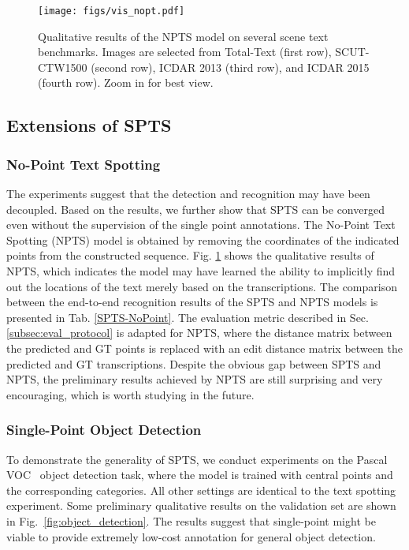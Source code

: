 \documentclass[sigconf]{acmart}
\begin{document}
\begin{figure}[t!]
    \centering
    \texttt{[image: figs/vis\_nopt.pdf]}
    \caption{Qualitative results of the NPTS model on several scene text benchmarks. Images are selected from Total-Text (first row), SCUT-CTW1500 (second row), ICDAR 2013 (third row), and ICDAR 2015 (fourth row). Zoom in for best view.}
    \label{fig:vis_wopoint}
\end{figure}

\subsection{Extensions of SPTS}
\subsubsection{No-Point Text Spotting}
The experiments suggest that the detection and recognition may have been decoupled. Based on the results, we further show that SPTS can be converged even without the supervision of the single point annotations. The No-Point Text Spotting (NPTS) model is obtained by removing the coordinates of the indicated points from the constructed sequence. Fig. \ref{fig:vis_wopoint} shows the qualitative results of NPTS, which indicates the model may have learned the ability to implicitly find out the locations of the text merely based on the transcriptions. The comparison between the end-to-end recognition results of the SPTS and NPTS models is presented in Tab. \ref{SPTS-NoPoint}. 
The evaluation metric described in Sec. \ref{subsec:eval_protocol} is adapted for NPTS, where the distance matrix between the predicted and GT points is replaced with an edit distance matrix between the predicted and GT transcriptions. 
Despite the obvious gap between SPTS and NPTS, the preliminary results achieved by NPTS are still surprising and very encouraging, which is worth studying in the future.

\subsubsection{Single-Point Object Detection}
To demonstrate the generality of SPTS, we conduct experiments on the Pascal VOC~\cite{everingham2010pascal} object detection task, where the model is trained with central points and the corresponding categories. All other settings are identical to the text spotting experiment. Some preliminary qualitative results on the validation set are shown in Fig.~\ref{fig:object_detection}. The results suggest that single-point might be viable to provide extremely low-cost annotation for general object detection.
\end{document}
